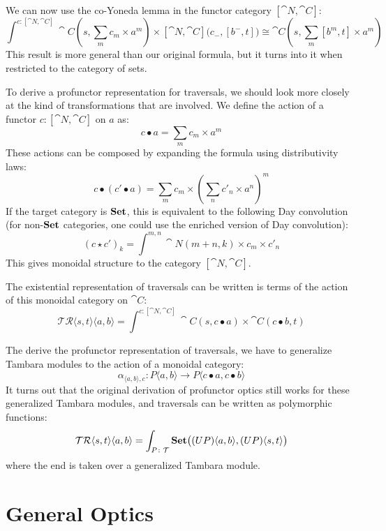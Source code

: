 \documentclass[DaoFP]{subfiles}
\begin{document}
We can now use the co-Yoneda lemma in the functor category $[\cat N, \cat C]$:
\[\int^{c \colon [\cat N, \cat C]} \cat C (s, \sum_m c_m \times a^m) \times  [\cat N, \cat C]\big(c_{-}, [b^{-}, t]\big) \cong \cat C(s, \sum_m [b^m, t] \times a^m)\]
This result is more general than our original formula, but it turns into it when restricted to the category of sets.

To derive a profunctor representation for traversals, we should look more closely at the kind of transformations that are involved. We define the action of a functor $c \colon [\cat N, \cat C]$ on $a$ as:
\[ c \bullet a = \sum_m c_m \times a^m \]
These actions can be composed by expanding the formula using distributivity laws:
\[ c \bullet (c' \bullet a) = \sum_m c_m \times (\sum_n c'_n \times a^n)^m \]
If the target category is $\mathbf{Set}$, this is equivalent to the following Day convolution (for non-$\mathbf{Set}$ categories, one could use the enriched version of Day convolution):
\[ (c \star c')_k = \int^{m, n} \cat N (m + n, k) \times c_m \times c'_n \]
This gives monoidal structure to the category $[\cat N, \cat C]$. 

The existential representation of traversals can be written is terms of the action of this monoidal category on $\cat C$:
\[ \mathcal{TR} \langle s, t\rangle \langle a, b \rangle = \int^{c \colon [\cat N, \cat C]} \cat C (s, c \bullet a) \times \cat C (c \bullet b, t) \]

The derive the profunctor representation of traversals, we have to generalize Tambara modules to the action of a monoidal category:
\[ \alpha_{\langle a, b\rangle, c} \colon P \langle a, b \rangle \to P \langle c \bullet a, c \bullet b \rangle \]
It turns out that the original derivation of profunctor optics still works for these generalized Tambara modules, and traversals can be written as polymorphic functions:
\[  \mathcal{TR}\langle s, t \rangle \langle a, b \rangle 
 =\int_{P \colon \mathcal{T}} \mathbf{Set} \big((U P) \langle a, b\rangle, (U P) \langle s, t\rangle \big) \]
where the end is taken over a generalized Tambara module.

\section{General Optics}
\end{document}
